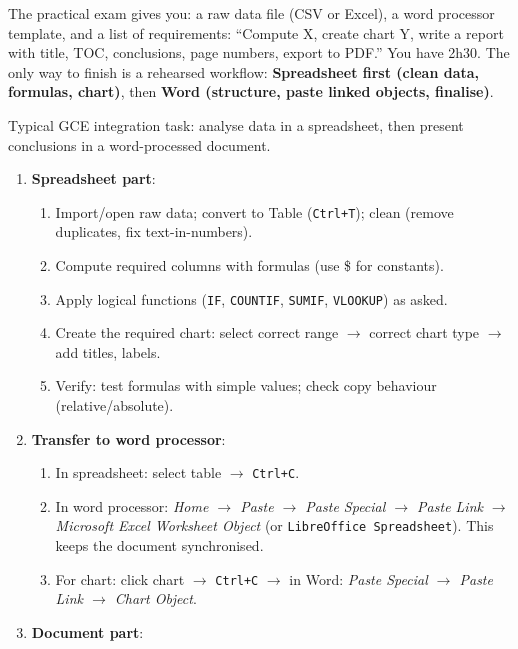 \documentclass[11pt]{article}
\begin{document}
\begin{experience}
The practical exam gives you: a raw data file (CSV or Excel), a word processor template, and a list of requirements: ``Compute X, create chart Y, write a report with title, TOC, conclusions, page numbers, export to PDF.'' You have 2h30. The only way to finish is a rehearsed workflow: \textbf{Spreadsheet first (clean data, formulas, chart)}, then \textbf{Word (structure, paste linked objects, finalise)}.
\end{experience}

\begin{methode}
Typical GCE integration task: analyse data in a spreadsheet, then present conclusions in a word-processed document.
\begin{enumerate}
\item \textbf{Spreadsheet part}:
\begin{enumerate}
\item Import/open raw data; convert to Table (\texttt{Ctrl+T}); clean (remove duplicates, fix text-in-numbers).
\item Compute required columns with formulas (use \$ for constants).
\item Apply logical functions (\texttt{IF}, \texttt{COUNTIF}, \texttt{SUMIF}, \texttt{VLOOKUP}) as asked.
\item Create the required chart: select correct range $\rightarrow$ correct chart type $\rightarrow$ add titles, labels.
\item Verify: test formulas with simple values; check copy behaviour (relative/absolute).
\end{enumerate}
\item \textbf{Transfer to word processor}:
\begin{enumerate}
\item In spreadsheet: select table $\rightarrow$ \texttt{Ctrl+C}.
\item In word processor: \emph{Home $\rightarrow$ Paste $\rightarrow$ Paste Special $\rightarrow$ Paste Link $\rightarrow$ Microsoft Excel Worksheet Object} (or \texttt{LibreOffice Spreadsheet}). This keeps the document synchronised.
\item For chart: click chart $\rightarrow$ \texttt{Ctrl+C} $\rightarrow$ in Word: \emph{Paste Special $\rightarrow$ Paste Link $\rightarrow$ Chart Object}.
\end{enumerate}
\item \textbf{Document part}:

\end{enumerate}
\end{methode}
\end{document}
